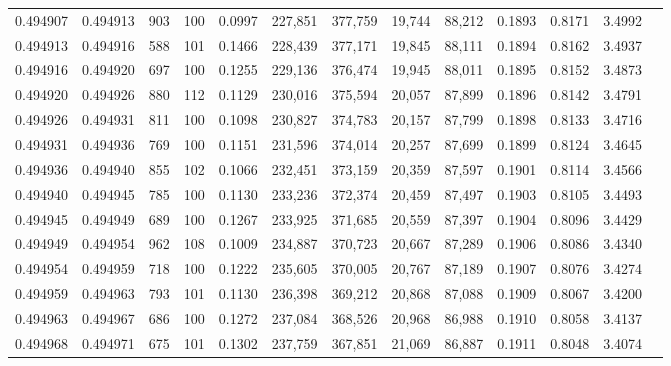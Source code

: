 \begin{tabular}{rrrrrrrrrrrrr}
0.494907 & 0.494913 &   903 & 100 &                                     0.0997 & 227,851 & 377,759 &  19,744 &  88,212 & 0.1893 & 0.8171 & 3.4992 \\
0.494913 & 0.494916 &   588 & 101 &                                     0.1466 & 228,439 & 377,171 &  19,845 &  88,111 & 0.1894 & 0.8162 & 3.4937 \\
0.494916 & 0.494920 &   697 & 100 &                                     0.1255 & 229,136 & 376,474 &  19,945 &  88,011 & 0.1895 & 0.8152 & 3.4873 \\
0.494920 & 0.494926 &   880 & 112 &                                     0.1129 & 230,016 & 375,594 &  20,057 &  87,899 & 0.1896 & 0.8142 & 3.4791 \\
0.494926 & 0.494931 &   811 & 100 &                                     0.1098 & 230,827 & 374,783 &  20,157 &  87,799 & 0.1898 & 0.8133 & 3.4716 \\
0.494931 & 0.494936 &   769 & 100 &                                     0.1151 & 231,596 & 374,014 &  20,257 &  87,699 & 0.1899 & 0.8124 & 3.4645 \\
0.494936 & 0.494940 &   855 & 102 &                                     0.1066 & 232,451 & 373,159 &  20,359 &  87,597 & 0.1901 & 0.8114 & 3.4566 \\
0.494940 & 0.494945 &   785 & 100 &                                     0.1130 & 233,236 & 372,374 &  20,459 &  87,497 & 0.1903 & 0.8105 & 3.4493 \\
0.494945 & 0.494949 &   689 & 100 &                                     0.1267 & 233,925 & 371,685 &  20,559 &  87,397 & 0.1904 & 0.8096 & 3.4429 \\
0.494949 & 0.494954 &   962 & 108 &                                     0.1009 & 234,887 & 370,723 &  20,667 &  87,289 & 0.1906 & 0.8086 & 3.4340 \\
0.494954 & 0.494959 &   718 & 100 &                                     0.1222 & 235,605 & 370,005 &  20,767 &  87,189 & 0.1907 & 0.8076 & 3.4274 \\
0.494959 & 0.494963 &   793 & 101 &                                     0.1130 & 236,398 & 369,212 &  20,868 &  87,088 & 0.1909 & 0.8067 & 3.4200 \\
0.494963 & 0.494967 &   686 & 100 &                                     0.1272 & 237,084 & 368,526 &  20,968 &  86,988 & 0.1910 & 0.8058 & 3.4137 \\
0.494968 & 0.494971 &   675 & 101 &                                     0.1302 & 237,759 & 367,851 &  21,069 &  86,887 & 0.1911 & 0.8048 & 3.4074 \\

\end{tabular}
